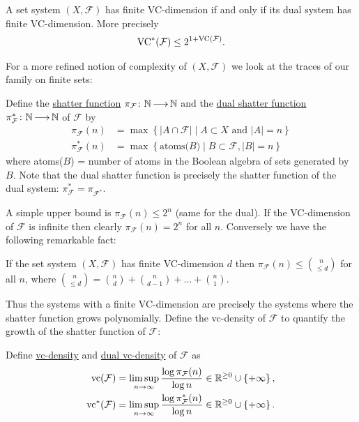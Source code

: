 \documentclass{amsart}
\newcommand{\F}{\mathcal F}
\newcommand{\curly}[1]{\left\{#1\right\}}
\newcommand{\defn}{\underline}
\begin{document}
\begin{Lemma}
  A set system $(X, \F)$ has finite VC-dimension if and only if its dual system has finite VC-dimension.
  More precisely
  \begin{align*}
    \VC^*(\F) \leq 2^{1+\VC(\F)}.
  \end{align*}
\end{Lemma}

For a more refined notion of complexity of $(X, \F)$ we look at the traces of our family on finite sets:
\begin{Definition}
  Define the \defn{shatter function} $\pi_\F \colon \N \arr \N$ and the \defn{dual shatter function} $\pi^*_\F \colon \N \arr \N$ of $\F$ by 
  \begin{align*}
    \pi_\F(n) &= \max \curly{|A \cap \F| \mid A \subset X \text{ and } |A| = n} \\
	  \pi^*_\F(n) &= \max \curly{\text{atoms($B$)} \mid B \subset \F, |B| = n}
  \end{align*}
    where atoms($B$) = number of atoms in the Boolean algebra of sets generated by $B$.
  Note that the dual shatter function is precisely the shatter function of the dual system: $\pi^*_\F = \pi_{\F^*}$.
\end{Definition}  

A simple upper bound is $\pi_\F(n) \leq 2^n$ (same for the dual).
If the VC-dimension of $\F$ is infinite then clearly $\pi_\F(n) = 2^n$ for all $n$. Conversely we have the following remarkable fact:
\begin{Theorem} 
  If the set system $(X, \F)$ has finite VC-dimension $d$ then $\pi_\F(n) \leq {n \choose \leq d}$ for all $n$, where
  ${n \choose \leq d} = {n \choose d} + {n \choose d - 1} + \ldots + {n \choose 1}$.    
\end{Theorem}

Thus the systems with a finite VC-dimension are precisely the systems where the shatter function grows polynomially.
Define the vc-density of $\F$ to quantify the growth of the shatter function of $\F$: 
\begin{Definition}
  Define \defn{vc-density} and \defn{dual vc-density} of $\F$ as
  \begin{align*}
    \vc(\F) &= \limsup_{n \to \infty}\frac{\log \pi_\F(n)}{\log n} \in \R^{\geq 0} \cup \curly{+\infty},\\
    \vc^*(\F) &= \limsup_{n \to \infty}\frac{\log \pi^*_\F(n)}{\log n}\in \R^{\geq 0} \cup \curly{+\infty}.
  \end{align*}
\end{Definition}
\end{document}
